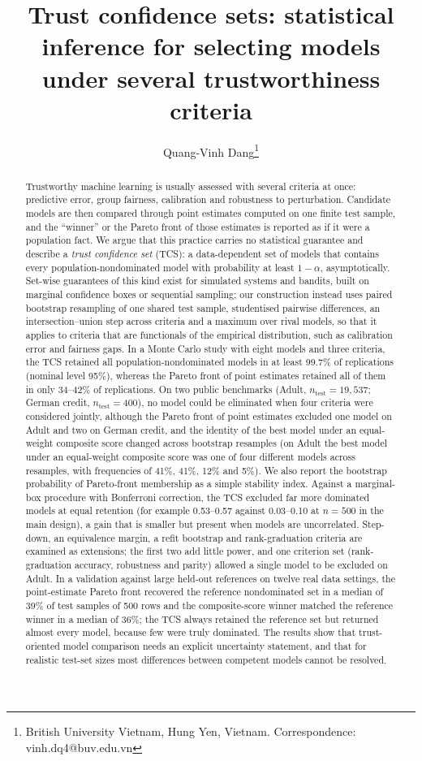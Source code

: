 \documentclass[11pt,a4paper]{article}
\title{Trust confidence sets: statistical inference for selecting models\\under several trustworthiness criteria}
\author{Quang-Vinh Dang\thanks{British University Vietnam, Hung Yen, Vietnam. Correspondence: vinh.dq4@buv.edu.vn}}
\date{}
\begin{document}
\maketitle

\begin{abstract}
Trustworthy machine learning is usually assessed with several criteria at once: predictive error, group fairness, calibration and robustness to perturbation. Candidate models are then compared through point estimates computed on one finite test sample, and the ``winner'' or the Pareto front of those estimates is reported as if it were a population fact. We argue that this practice carries no statistical guarantee and describe a \emph{trust confidence set} (TCS): a data-dependent set of models that contains every population-nondominated model with probability at least $1-\alpha$, asymptotically. Set-wise guarantees of this kind exist for simulated systems and bandits, built on marginal confidence boxes or sequential sampling; our construction instead uses paired bootstrap resampling of one shared test sample, studentised pairwise differences, an intersection--union step across criteria and a maximum over rival models, so that it applies to criteria that are functionals of the empirical distribution, such as calibration error and fairness gaps. In a Monte Carlo study with eight models and three criteria, the TCS retained all population-nondominated models in at least 99.7\% of replications (nominal level 95\%), whereas the Pareto front of point estimates retained all of them in only 34--42\% of replications. On two public benchmarks (Adult, $n_{\text{test}}=19{,}537$; German credit, $n_{\text{test}}=400$), no model could be eliminated when four criteria were considered jointly, although the Pareto front of point estimates excluded one model on Adult and two on German credit, and the identity of the best model under an equal-weight composite score changed across bootstrap resamples (on Adult the best model under an equal-weight composite score was one of four different models across resamples, with frequencies of 41\%, 41\%, 12\% and 5\%). We also report the bootstrap probability of Pareto-front membership as a simple stability index. Against a marginal-box procedure with Bonferroni correction, the TCS excluded far more dominated models at equal retention (for example 0.53--0.57 against 0.03--0.10 at $n=500$ in the main design), a gain that is smaller but present when models are uncorrelated. Step-down, an equivalence margin, a refit bootstrap and rank-graduation criteria are examined as extensions; the first two add little power, and one criterion set (rank-graduation accuracy, robustness and parity) allowed a single model to be excluded on Adult. In a validation against large held-out references on twelve real data settings, the point-estimate Pareto front recovered the reference nondominated set in a median of 39\% of test samples of 500 rows and the composite-score winner matched the reference winner in a median of 36\%; the TCS always retained the reference set but returned almost every model, because few were truly dominated. The results show that trust-oriented model comparison needs an explicit uncertainty statement, and that for realistic test-set sizes most differences between competent models cannot be resolved.

\end{abstract}
\end{document}
